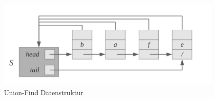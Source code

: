 \begin{figure}
  \centering
  \includegraphics{res/disjoint}

  \caption{Union-Find Datenstruktur}
\end{figure}